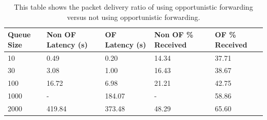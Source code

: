         \begin{table}
            \centering
            \begin{tabularx}{0.8\linewidth}{|X|X|X|X|X|}
                \hline
                \multicolumn{1}{|X|}{\centering Queue Size} & 
                \multicolumn{1}{|X|}{\centering Non OF Latency (s)} & 
                \multicolumn{1}{|X|}{\centering OF Latency (s)} & 
                \multicolumn{1}{|X|}{\centering Non OF \% Received} & 
                \multicolumn{1}{|X|}{\centering OF \% Received} \\
                \hline
                10 & 0.49 & 0.20 & 14.34 & 37.71 \\
                30 & 3.08 & 1.00 & 16.43 & 38.67 \\
                100 & 16.72 & 6.98 & 21.21 & 42.75 \\
                1000 & - & 184.07 & - & 58.86 \\
                2000 & 419.84 & 373.48 & 48.29 & 65.60 \\
                \hline
            \end{tabularx}
            \caption{This table shows the packet delivery ratio of using opportunistic forwarding versus not using opportunistic forwarding.}
            \label{tab:opportunistic_queue_good}
        \end{table}
        
